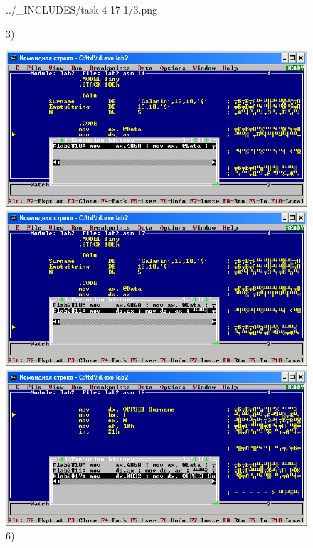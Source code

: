 \begin{figure}[!htp]
\begin {minipage}{0.32\textwidth}
            {../_INCLUDES/task-4-17-1/3.png}
        \caption{3) }
        \label{fig:task_4_17_2__3}
    \end{minipage}
\end{figure}

\begin{figure}[!htp]
    \centering
    \begin{minipage}{0.32\textwidth}
        \centering
        \includegraphics[width=.99\linewidth]
            {../_INCLUDES/task-4-17-1/4.png}
        \caption{4) }
        \label{fig:task_4_17_2__4}
    \end{minipage}
    \begin {minipage}{0.32\textwidth}
        \centering
        \includegraphics[width=.99\linewidth]
            {../_INCLUDES/task-4-17-1/5.png}
        \caption{5) }
        \label{fig:task_4_17_2__5}
    \end{minipage}
    \begin {minipage}{0.32\textwidth}
        \centering
        \includegraphics[width=.99\linewidth]
            {../_INCLUDES/task-4-17-1/6.png}
        \caption{6) }
        \label{fig:task_4_17_2__6}
    \end{minipage}
\end{figure}

